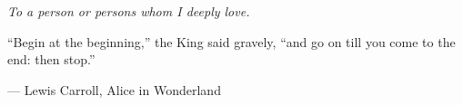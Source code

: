 \documentclass[../thesis.tex]{subfiles}
\begin{document}
\vspace*{.2\textheight} %
\begin{center}
    \textit{To a person or persons whom I deeply love.}\\[\baselineskip]

    \epigraph{``Begin at the beginning,'' the King said gravely, ``and go on till you
    come to the end: then stop.''}{--- \textup{Lewis Carroll}, Alice in Wonderland}

    \begin{epigraphs}
    \end{epigraphs}
\end{center}
\vfill
\end{document}
